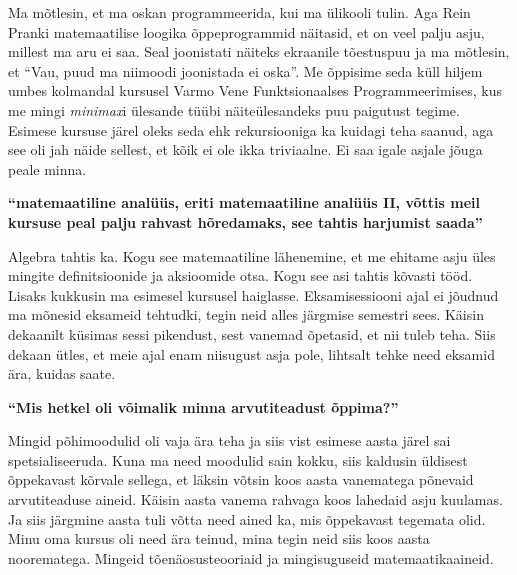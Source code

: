 Ma mõtlesin, et ma oskan programmeerida, kui ma ülikooli tulin. Aga Rein Pranki matemaatilise loogika õppeprogrammid näitasid, et on veel palju asju, millest ma aru ei saa. Seal joonistati näiteks ekraanile tõestuspuu ja ma mõtlesin, et \enquote{Vau, puud ma niimoodi joonistada ei oska}. Me õppisime seda küll hiljem umbes kolmandal kursusel Varmo Vene Funktsionaalses Programmeerimises, kus me mingi \emph{minimax}i ülesande tüübi näiteülesandeks puu paigutust tegime. Esimese kursuse järel oleks seda ehk rekursiooniga ka kuidagi teha saanud, aga see oli jah näide sellest, et kõik ei ole ikka triviaalne. Ei saa igale asjale jõuga peale minna. 

\textbf{\enquote{matemaatiline analüüs, eriti matemaatiline analüüs II, võttis meil kursuse peal palju rahvast hõredamaks, see tahtis harjumist saada}}

Algebra tahtis ka. Kogu see matemaatiline lähenemine, et me ehitame asju üles mingite definitsioonide ja aksioomide otsa. Kogu see asi tahtis kõvasti tööd. Lisaks kukkusin ma esimesel kursusel haiglasse. Eksamisessiooni ajal ei jõudnud ma mõnesid eksameid tehtudki, tegin neid alles järgmise semestri sees. Käisin dekaanilt küsimas sessi pikendust, sest vanemad õpetasid, et nii tuleb teha. Siis dekaan ütles, et meie ajal enam niisugust asja pole, lihtsalt tehke need eksamid ära, kuidas saate. 

\textbf{\enquote{Mis hetkel oli võimalik minna arvutiteadust õppima?}} 

Mingid põhimoodulid oli vaja ära teha ja siis vist esimese aasta järel sai spetsialiseeruda. Kuna ma need moodulid sain kokku, siis kaldusin üldisest õppekavast kõrvale sellega, et läksin võtsin koos aasta vanematega põnevaid arvutiteaduse aineid. Käisin aasta vanema rahvaga koos lahedaid asju kuulamas. Ja siis järgmine aasta tuli võtta need ained ka, mis õppekavast tegemata olid. Minu oma kursus oli need ära teinud, mina tegin neid siis koos aasta noorematega. Mingeid tõenäosusteooriaid ja mingisuguseid matemaatikaaineid.

